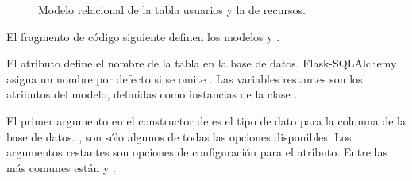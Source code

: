 \begin{figure}[htbp]
\centering
\capstart

\noindent{}
\caption{Modelo relacional de la tabla usuarios y la de recursos.}\label{\detokenize{chapter_two/desc_cloudnao:relationship-example}}\end{figure}

El fragmento de código siguiente definen los modelos  y .

\begin{sphinxVerbatim}[commandchars=\\\{\}]
 
    
     
      
    
 
    
     
    
\end{sphinxVerbatim}

El atributo   define el nombre de la tabla en la base de datos.
Flask-SQLAlchemy asigna un nombre por defecto si se omite .
Las variables restantes son los atributos del modelo, definidas como instancias
de la clase .

El primer argumento en el constructor de  es el tipo de dato
para la columna de la base de datos. , son
sólo algunos de todas las opciones disponibles.
Los argumentos restantes son opciones de configuración para el atributo. Entre
las más comunes están  y  .


